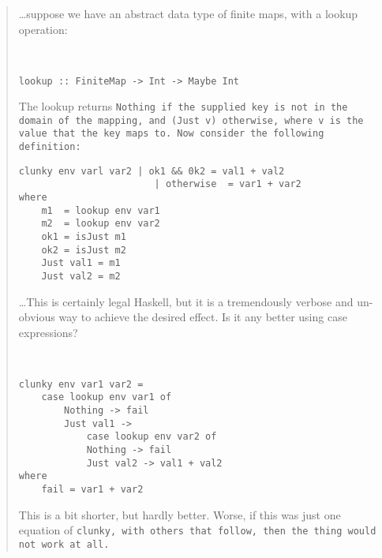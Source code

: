 \documentclass[manuscript,screen,review, 12pt]{acmart}
\begin{document}
    \begin{quote}
    
    \dots suppose we have an abstract data type of finite maps, with a lookup
    operation:

        \begin{verbatim}


lookup :: FiniteMap -> Int -> Maybe Int
        \end{verbatim}

        The lookup returns \tt{Nothing} if the supplied key is not in the domain of
    the mapping, and \tt{(Just v)} otherwise, where \tt{v} is the value that the
    key maps to. Now consider the following definition:


    \begin{minipage}{\textwidth}
        \begin{verbatim}
clunky env varl var2 | ok1 && 0k2 = val1 + val2 
                        | otherwise  = var1 + var2 
where 
    m1  = lookup env var1 
    m2  = lookup env var2
    ok1 = isJust m1 
    ok2 = isJust m2 
    Just val1 = m1 
    Just val2 = m2    
        \end{verbatim}        
    \end{minipage}
        
    \dots This is certainly legal Haskell, but it is a tremendously verbose and
    un-obvious way to achieve the desired effect. Is it any better using case
    expressions?

    
        \begin{minipage}{\textwidth}
            \begin{verbatim}


clunky env var1 var2 = 
    case lookup env var1 of 
        Nothing -> fail 
        Just val1 -> 
            case lookup env var2 of 
            Nothing -> fail 
            Just val2 -> val1 + val2
where 
    fail = var1 + var2
            \end{verbatim}
        \end{minipage}
    
        This is a bit shorter, but hardly better. Worse, if this was just one
        equation of \tt{clunky}, with others that follow, then the thing would
        not work at all.

    \end{quote}
\end{document}
